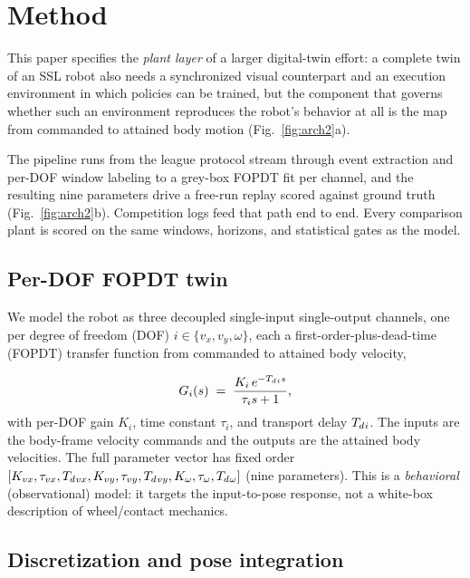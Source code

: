 \section{Method}
\label{sec:method}



This paper specifies the \emph{plant layer} of a larger digital-twin effort: a complete twin of an SSL robot also needs a synchronized visual counterpart and an execution environment in which policies can be trained, but the component that governs whether such an environment reproduces the robot's behavior at all is the map from commanded to attained body motion (Fig.~\ref{fig:arch2}a).

The pipeline runs from the league protocol stream through event extraction and per-DOF window labeling to a grey-box FOPDT fit per channel, and the resulting nine parameters drive a free-run replay scored against ground truth (Fig.~\ref{fig:arch2}b). Competition logs feed that path end to end. Every comparison plant is scored on the same windows, horizons, and statistical gates as the model.

\subsection{Per-DOF FOPDT twin}
\label{sec:method:model}
We model the robot as three decoupled single-input single-output channels, one per degree of freedom (DOF) $i\in\{v_x, v_y, \omega\}$, each a first-order-plus-dead-time (FOPDT) transfer function from commanded to attained body velocity,

\begin{equation}
  G_i(s) \;=\; \frac{K_i\, e^{-T_{d}{}_i s}}{\tau_i s + 1},
  \label{eq:fopdt}
\end{equation}
with per-DOF gain $K_i$, time constant $\tau_i$, and transport delay $T_{d}{}_i$. The inputs are the body-frame velocity commands and the outputs are the attained body velocities. The full parameter vector has fixed order $[K_{vx},\tau_{vx},T_{d}{}_{vx},K_{vy},\tau_{vy},T_{d}{}_{vy},K_{\omega},\tau_{\omega},T_{d}{}_{\omega}]$
(nine parameters). %
This is a \emph{behavioral} (observational) model: it targets the input-to-pose
response, not a white-box description of wheel/contact mechanics.

\subsection{Discretization and pose integration}
\label{sec:method:disc}

